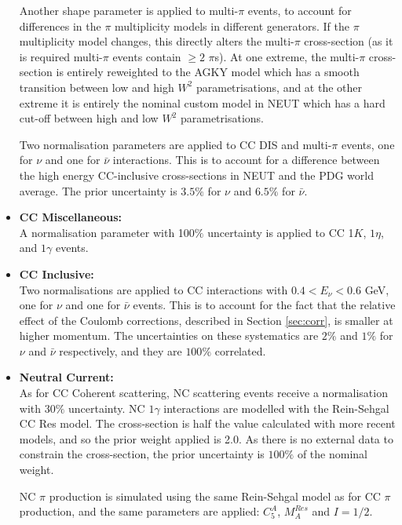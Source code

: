 \begin{itemize}
Another shape parameter is applied to multi-$\pi$ events, to account for differences in the $\pi$ multiplicity models in different generators. If the $\pi$ multiplicity model changes, this directly alters the multi-$\pi$ cross-section (as it is required multi-$\pi$ events contain $\geq2$ $\pi$s). At one extreme, the multi-$\pi$ cross-section is entirely reweighted to the AGKY model\cite{agky} which has a smooth transition between low and high $W^2$ parametrisations, and at the other extreme it is entirely the nominal custom model in \textsc{NEUT} which has a hard cut-off between high and low $W^2$ parametrisations.

Two normalisation parameters are applied to CC DIS and multi-$\pi$ events, one for $\nu$ and one for $\bar{\nu}$ interactions. This is to account for a difference between the high energy CC-inclusive cross-sections in \textsc{NEUT} and the PDG world average. The prior uncertainty is $3.5\%$ for $\nu$ and $6.5\%$ for $\bar{\nu}$.

\item \textbf{CC Miscellaneous:}\\
A normalisation parameter with 100$\%$ uncertainty is applied to CC 1$K$, $1\eta$, and $1\gamma$ events.

\item \textbf{CC Inclusive:}\\
Two normalisations are applied to CC interactions with $0.4 < E_{\nu} < 0.6$ GeV, one for $\nu$ and one for $\bar{\nu}$ events. This is to account for the fact that the relative effect of the Coulomb corrections, described in Section \ref{sec:corr}, is smaller at higher momentum. The uncertainties on these systematics are $2\%$ and $1\%$ for $\nu$ and $\bar{\nu}$ respectively, and they are $100\%$ correlated.

\item \textbf{Neutral Current:}\\
As for CC Coherent scattering, NC scattering events receive a normalisation with $30\%$ uncertainty. NC $1\gamma$ interactions are modelled with the Rein-Sehgal CC Res model. The cross-section is half the value calculated with more recent models\cite{NCxsec}, and so the prior weight applied is 2.0. As there is no external data to constrain the cross-section, the prior uncertainty is $100\%$ of the nominal weight.

NC $\pi$ production is simulated using the same Rein-Sehgal model as for CC $\pi$ production, and the same parameters are applied: $C^{A}_{5}$, $M^{Res}_{A}$ and $I=1/2$.


\end{itemize}

